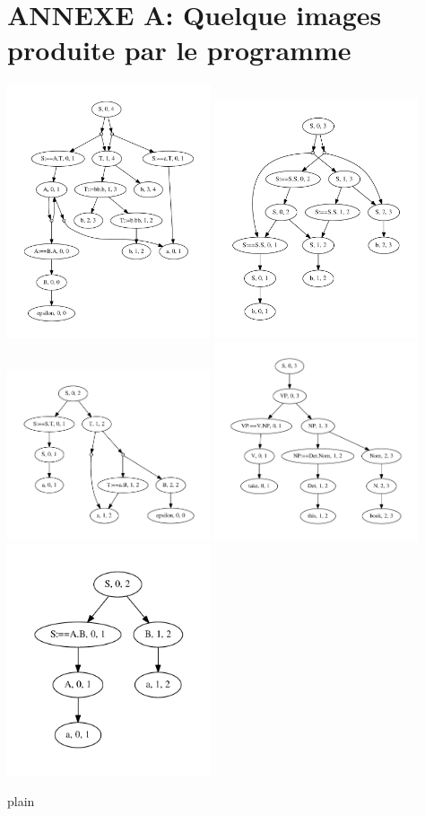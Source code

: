 \documentclass[10pt]{report}
\begin{document}
\chapter{ANNEXE A: Quelque images produite par le programme}

\includegraphics[width=6cm]{ast1.pdf}
\includegraphics[width=6cm]{ast2.pdf}
\includegraphics[width=6cm]{ast3.pdf}
\includegraphics[width=6cm]{ast4.pdf}
\includegraphics[width=6cm]{ast5.pdf}

 {plain}
  
\end{document}
